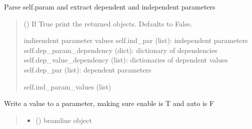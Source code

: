 \documentclass[letterpaper,10pt,english]{sphinxmanual}
\begin{document}
\begin{fulllineitems}
\begin{fulllineitems}
\label{\detokenize{index:raypyng.simulate.SimulationParams._extract_param}}
\pysigstartsignatures
{}
\pysigstopsignatures
\sphinxAtStartPar
Parse self.param and extract dependent and independent parameters
\begin{quote}\begin{description}
\sphinxAtStartPar
{} (\sphinxstyleliteralemphasis{\sphinxupquote{, }}) \textendash{} If True print the returned objects. Defaults to False.

\sphinxAtStartPar
indieendent parameter values
self.ind\_par (list): independent parameters
self.dep\_param\_dependency (dict): dictionary of dependencies
self.dep\_value\_dependency (list): dictionaries of dependent values
self.dep\_par (list): dependent parameters

\sphinxAtStartPar
self.ind\_param\_values (list)

\end{description}\end{quote}

\end{fulllineitems}


\begin{fulllineitems}
\label{\detokenize{index:raypyng.simulate.SimulationParams._write_value_to_param}}
\pysigstartsignatures
{}
\pysigstopsignatures
\sphinxAtStartPar
Write a value to a parameter, making sure enable is T
and auto is F
\begin{quote}\begin{description}
\begin{itemize}
\item {} 
\sphinxAtStartPar
{} () \textendash{} beamline object


\end{itemize}
\end{description}
\end{quote}
\end{fulllineitems}
\end{fulllineitems}
\end{document}
